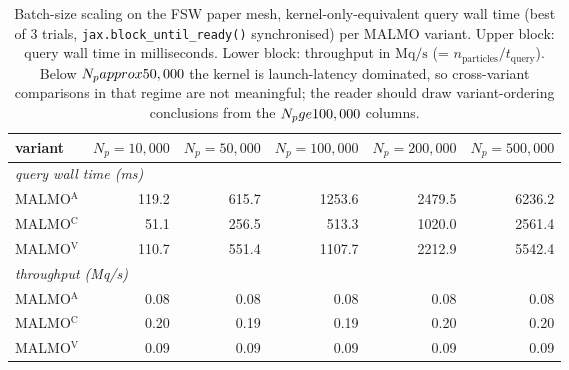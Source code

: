 \begin{table}[t]
\centering\small
\caption{Batch-size scaling on the FSW paper mesh, kernel-only-equivalent query wall time (best of 3 trials, \texttt{jax.block\_until\_ready()} synchronised) per MALMO variant.  Upper block: query wall time in milliseconds.  Lower block: throughput in $\text{Mq}/\text{s}$ (= $n_\text{particles}/t_\text{query}$).  Below $N_p \\approx 50\\,000$ the kernel is launch-latency dominated, so cross-variant comparisons in that regime are not meaningful; the reader should draw variant-ordering conclusions from the $N_p \\ge 100\\,000$ columns.}
\label{tab:r27-batch-FSW-paper}
\begin{tabular}{lrrrrr}
\toprule
variant & $N_p{=}10{,}000$ & $N_p{=}50{,}000$ & $N_p{=}100{,}000$ & $N_p{=}200{,}000$ & $N_p{=}500{,}000$ \\
\midrule
\multicolumn{6}{l}{\emph{query wall time (ms)}} \\
MALMO$^{\mathrm{A}}$ & 119.2 & 615.7 & 1253.6 & 2479.5 & 6236.2 \\
MALMO$^{\mathrm{C}}$ & 51.1 & 256.5 & 513.3 & 1020.0 & 2561.4 \\
MALMO$^{\mathrm{V}}$ & 110.7 & 551.4 & 1107.7 & 2212.9 & 5542.4 \\
\midrule
\multicolumn{6}{l}{\emph{throughput (Mq/s)}} \\
MALMO$^{\mathrm{A}}$ & 0.08 & 0.08 & 0.08 & 0.08 & 0.08 \\
MALMO$^{\mathrm{C}}$ & 0.20 & 0.19 & 0.19 & 0.20 & 0.20 \\
MALMO$^{\mathrm{V}}$ & 0.09 & 0.09 & 0.09 & 0.09 & 0.09 \\
\bottomrule
\end{tabular}
\end{table}
